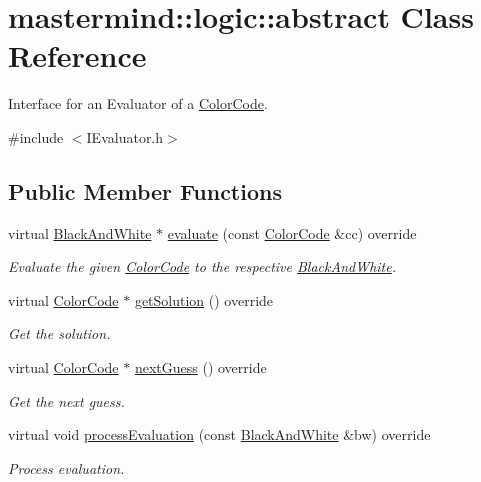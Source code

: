 \hypertarget{classmastermind_1_1logic_1_1abstract}{}\section{mastermind\+:\+:logic\+:\+:abstract Class Reference}
\label{classmastermind_1_1logic_1_1abstract}


Interface for an Evaluator of a \hyperlink{classmastermind_1_1logic_1_1_color_code}{Color\+Code}.  




{\ttfamily \#include $<$I\+Evaluator.\+h$>$}

\subsection*{Public Member Functions}
\begin{DoxyCompactItemize}
\item 
virtual \hyperlink{classmastermind_1_1logic_1_1_black_and_white}{Black\+And\+White} $\ast$ \hyperlink{classmastermind_1_1logic_1_1abstract_a42fd7e506150c1f6a486f9619a7cc337}{evaluate} (const \hyperlink{classmastermind_1_1logic_1_1_color_code}{Color\+Code} \&cc) override
\begin{DoxyCompactList}\small\item\em Evaluate the given \hyperlink{classmastermind_1_1logic_1_1_color_code}{Color\+Code} to the respective \hyperlink{classmastermind_1_1logic_1_1_black_and_white}{Black\+And\+White}. \end{DoxyCompactList}\item 
virtual \hyperlink{classmastermind_1_1logic_1_1_color_code}{Color\+Code} $\ast$ \hyperlink{classmastermind_1_1logic_1_1abstract_a3d7e6bdbf8f3926fd42907d86291a373}{get\+Solution} () override
\begin{DoxyCompactList}\small\item\em Get the solution. \end{DoxyCompactList}\item 
virtual \hyperlink{classmastermind_1_1logic_1_1_color_code}{Color\+Code} $\ast$ \hyperlink{classmastermind_1_1logic_1_1abstract_ae4e30322061ea0ebc302274c79c5ca47}{next\+Guess} () override
\begin{DoxyCompactList}\small\item\em Get the next guess. \end{DoxyCompactList}\item 
virtual void \hyperlink{classmastermind_1_1logic_1_1abstract_ad44cfe3ef7f44a27de1522a6510ebd07}{process\+Evaluation} (const \hyperlink{classmastermind_1_1logic_1_1_black_and_white}{Black\+And\+White} \&bw) override
\begin{DoxyCompactList}\small\item\em Process evaluation. \end{DoxyCompactList}\end{DoxyCompactItemize}


